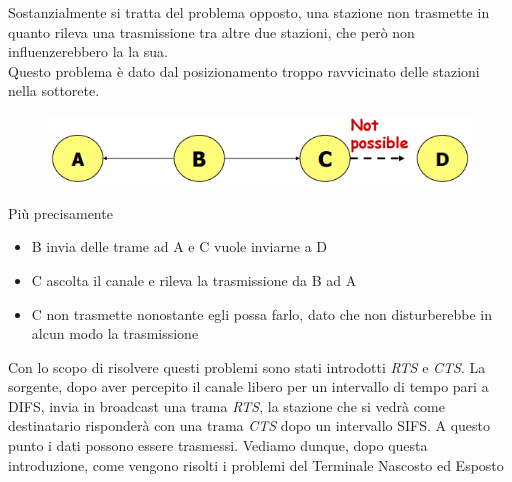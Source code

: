 \documentclass{article}
\newcounter{subsubsubsection}[subsubsection]
\begin{document}
                    Sostanzialmente si tratta del problema opposto, una stazione non trasmette in quanto rileva una trasmissione tra altre due stazioni, che però non influenzerebbero la la sua.\\
                    Questo problema è dato dal posizionamento troppo ravvicinato delle stazioni nella sottorete.
                    \begin{figure}[H]
                        \centering
                        \includegraphics[width=\textwidth]{pic/terminale_esposto.png}
                        \label{Problema del Terminale Esposto}
                    \end{figure}
                    Più precisamente
                    \begin{itemize}
                        \item B invia delle trame ad A e C vuole inviarne a D
                        \item C ascolta il canale e rileva la trasmissione da B ad A
                        \item C non trasmette nonostante egli possa farlo, dato che non disturberebbe in alcun modo la trasmissione
                    \end{itemize}

                    Con lo scopo di risolvere questi problemi sono stati introdotti \textit{RTS} e \textit{CTS}.
                    La sorgente, dopo aver percepito il canale libero per un intervallo di tempo pari a DIFS, invia in broadcast una trama \textit{RTS}, la stazione che si vedrà come destinatario risponderà con una trama \textit{CTS} dopo un intervallo SIFS. A questo punto i dati possono essere trasmessi.
                    Vediamo dunque, dopo questa introduzione, come vengono risolti i problemi del Terminale Nascosto ed Esposto
\end{document}
